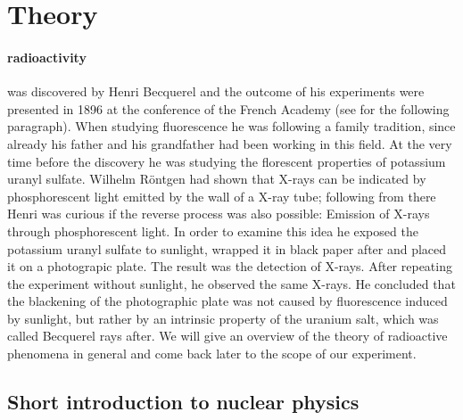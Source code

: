 \section{Theory}
\label{sec:theory}
\paragraph{radioactivity} was discovered by Henri Becquerel and the outcome of his experiments
were presented in 1896 at the conference of the French Academy (see \cite{konya2012nuclear} for the
following paragraph). 
When studying 
fluorescence he was following a family tradition, since already his father and his grandfather had been
working in this field. At the very time before the discovery he was studying the florescent properties
of potassium uranyl sulfate. Wilhelm Röntgen had shown that X-rays can be indicated by phosphorescent light
emitted by the wall of a X-ray tube; following from there Henri was curious if the reverse process was also
possible: Emission of X-rays through phosphorescent light. In order to examine this idea he exposed
the potassium uranyl sulfate to sunlight, wrapped it in black paper after and placed it on a photograpic plate.
The result was the detection of X-rays. After repeating the experiment without sunlight, he observed the 
same X-rays. He concluded that the blackening of the photographic plate was not caused by fluorescence
induced by sunlight, but rather by an intrinsic property of the uranium salt, which was called Becquerel rays
after. We will give an overview of the theory of radioactive phenomena in general and come back later
to the scope of our experiment.
\subsection{Short introduction to nuclear physics}
